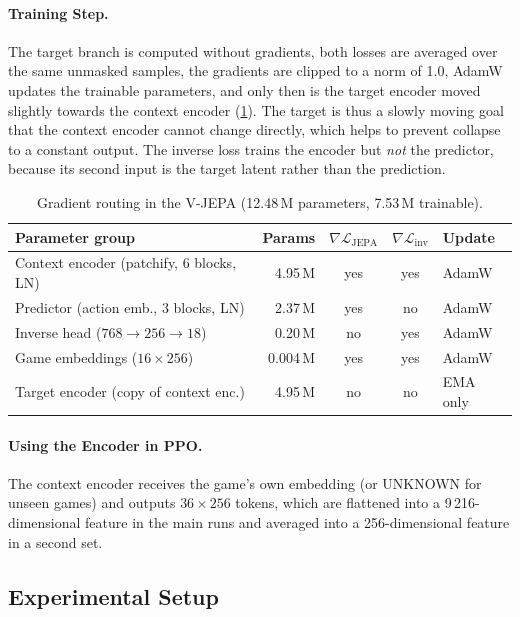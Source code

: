 \documentclass[runningheads,a4paper]{llncs}
\begin{document}
\paragraph{Training Step.} The target branch is computed without gradients, both losses are
averaged over the same unmasked samples, the gradients are clipped to a norm of 1.0, AdamW
updates the trainable parameters, and only then is the target encoder moved slightly towards the context encoder (\cref{tab:grad}). The target is thus a slowly moving goal that the context encoder cannot change directly,
which helps to prevent collapse to a constant output.
The inverse loss trains the encoder but \emph{not} the predictor, because its second input is
the target latent rather than the prediction.

\begin{table}[tb]
\centering
\caption{Gradient routing in the V-JEPA (12.48\,M parameters, 7.53\,M trainable).}
\label{tab:grad}
\footnotesize\setlength{\tabcolsep}{4pt}
\begin{tabular}{@{}lrccl@{}}
\toprule
Parameter group & Params & $\nabla\mathcal{L}_{\text{JEPA}}$ & $\nabla\mathcal{L}_{\text{inv}}$ & Update \\
\midrule
Context encoder (patchify, 6 blocks, LN) & 4.95\,M & yes & yes & AdamW \\
Predictor (action emb., 3 blocks, LN) & 2.37\,M & yes & no & AdamW \\
Inverse head ($768\to256\to18$) & 0.20\,M & no & yes & AdamW \\
Game embeddings ($16\times256$) & 0.004\,M & yes & yes & AdamW \\
Target encoder (copy of context enc.) & 4.95\,M & no & no & EMA only \\
\bottomrule
\end{tabular}
\end{table}

\paragraph{Using the Encoder in PPO.} The context encoder receives the game's own embedding (or UNKNOWN for
unseen games) and outputs $36\times256$ tokens, which are flattened into a 9\,216-dimensional
feature in the main runs and averaged into a 256-dimensional feature in a second set.

\subsection{Experimental Setup}
\label{sec:setup}
\end{document}
